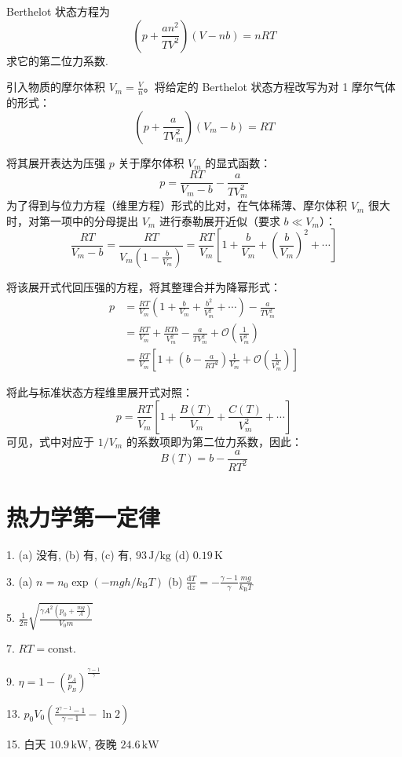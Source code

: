 \begin{exercise}\label{ex:10.7}
Berthelot 状态方程为
$$\left( p + \frac{an^2}{TV^2} \right)(V - nb) = nRT$$
求它的第二位力系数.
\end{exercise}
\begin{solution}
引入物质的摩尔体积 $V_m = \frac{V}{n}$。将给定的 Berthelot 状态方程改写为对 1 摩尔气体的形式：
$$ \left( p + \frac{a}{T V_m^2} \right) (V_m - b) = RT $$

将其展开表达为压强 $p$ 关于摩尔体积 $V_m$ 的显式函数：
$$ p = \frac{RT}{V_m - b} - \frac{a}{T V_m^2} $$
为了得到与位力方程（维里方程）形式的比对，在气体稀薄、摩尔体积 $V_m$ 很大时，对第一项中的分母提出 $V_m$ 进行泰勒展开近似（要求 $b \ll V_m$）：
$$ \frac{RT}{V_m - b} = \frac{RT}{V_m \left( 1 - \frac{b}{V_m} \right)} = \frac{RT}{V_m} \left[ 1 + \frac{b}{V_m} + \left( \frac{b}{V_m} \right)^2 + \cdots \right] $$

将该展开式代回压强的方程，将其整理合并为降幂形式：
\begin{align*}
    p &= \frac{RT}{V_m} \left( 1 + \frac{b}{V_m} + \frac{b^2}{V_m^2} + \cdots \right) - \frac{a}{T V_m^2} \\
      &= \frac{RT}{V_m} + \frac{RT b}{V_m^2} - \frac{a}{T V_m^2} + \mathcal{O}\left(\frac{1}{V_m^3}\right) \\
      &= \frac{RT}{V_m} \left[ 1 + \left( b - \frac{a}{RT^2} \right) \frac{1}{V_m} + \mathcal{O}\left(\frac{1}{V_m^2}\right) \right]
\end{align*}

将此与标准状态方程维里展开式对照：
$$ p = \frac{RT}{V_m} \left[ 1 + \frac{B(T)}{V_m} + \frac{C(T)}{V_m^2} + \cdots \right] $$
可见，式中对应于 $1/V_m$ 的系数项即为第二位力系数，因此：
$$ B(T) = b - \frac{a}{RT^2} $$
\end{solution}



\chapter{热力学第一定律}

\begin{oddanswers}
1. (a) 没有, (b) 有, (c) 有, $93\,\mathrm{J/kg}$
(d) $0.19\,\mathrm{K}$

3. (a) $n = n_0 \exp(-mgh/k_{\mathrm{B}} T)$
(b) $\frac{\mathrm{d}T}{\mathrm{d}z} = - \frac{\gamma - 1}{\gamma} \frac{mg}{k_{\mathrm{B}} T}$

5. $\frac{1}{2\pi} \sqrt{\frac{\gamma A^2 \left(p_0 + \frac{mg}{A}\right)}{V_0 m}}$

7. $RT = \text{const.}$

9. $\eta = 1 - \left(\frac{p_A}{p_B}\right)^{\frac{\gamma - 1}{\gamma}}$

13. $p_0 V_0 \left( \frac{2^{\gamma - 1} - 1}{\gamma - 1} - \ln 2 \right)$

15. 白天 $10.9\,\mathrm{kW}$, 夜晚 $24.6\,\mathrm{kW}$
\end{oddanswers}

